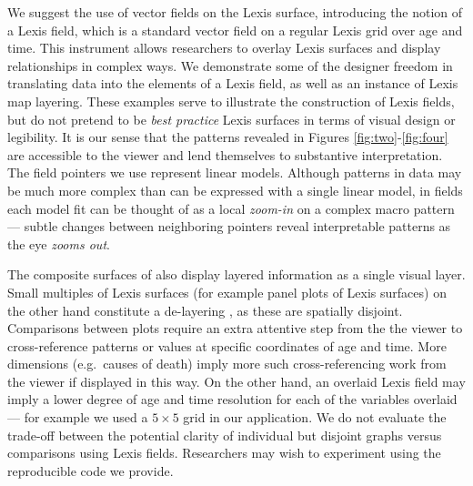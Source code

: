 \documentclass[10pt, twoside, parskip=half]{article}
\begin{document}
We suggest the use of vector fields on the Lexis surface, introducing the notion of a Lexis field, which is a standard vector field on a regular Lexis grid over age and time. This instrument allows researchers to overlay Lexis surfaces and display relationships in complex ways. We demonstrate some of the designer freedom in translating data into the elements of a Lexis field, as well as an instance of Lexis map layering. These examples serve to illustrate the construction of Lexis fields, but do not pretend to be \emph{best practice} Lexis surfaces in terms of visual design or legibility. It is our sense that the patterns revealed in Figures \ref{fig:two}-\ref{fig:four} are accessible to the viewer and lend themselves to substantive interpretation. The field pointers we use represent linear models. Although patterns in data may be much more complex than can be expressed with a single linear model, in fields each model fit can be thought of as a local \emph{zoom-in} on a complex macro pattern --- subtle changes between neighboring pointers reveal interpretable patterns as the eye \emph{zooms out}.

The composite surfaces of \citet{scholey2017visualizing} also display layered information as a single visual layer. Small multiples of Lexis surfaces (for example panel plots of Lexis surfaces) on the other hand constitute a de-layering \citep[c.f.][\citet{kashnitsky2019geofaceting}]{remund2018cause}, as these are spatially disjoint. Comparisons between plots require an extra attentive step from the the viewer to cross-reference patterns or values at specific coordinates of age and time. More dimensions (e.g.~causes of death) imply more such cross-referencing work from the viewer if displayed in this way. On the other hand, an overlaid Lexis field may imply a lower degree of age and time resolution for each of the variables overlaid --- for example we used a \(5\times 5\) grid in our application. We do not evaluate the trade-off between the potential clarity of individual but disjoint graphs versus comparisons using Lexis fields. Researchers may wish to experiment using the reproducible code we provide.
\end{document}
